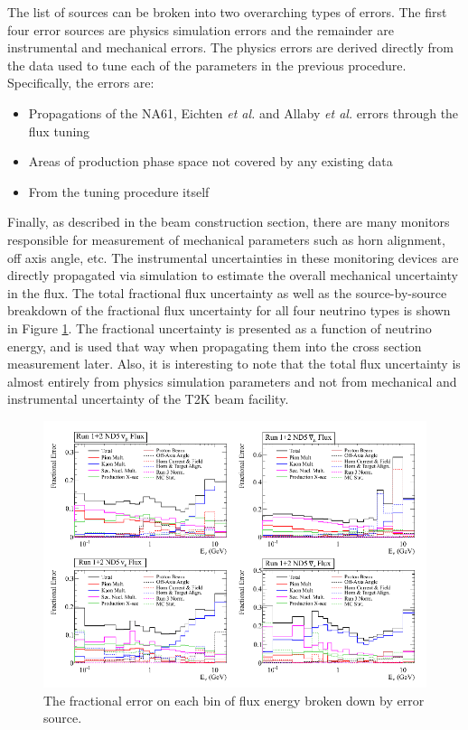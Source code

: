 The list of sources can be broken into two overarching types of errors. The first four error sources are physics simulation errors and the remainder are instrumental and mechanical errors. The physics errors are derived directly from the data used to tune each of the parameters in the previous procedure. Specifically, the errors are:

\begin{itemize}
\item Propagations of the NA61, Eichten {\it et al.} and Allaby {\it et al.} errors through the flux tuning
\item Areas of production phase space not covered by any existing data
\item From the tuning procedure itself
\end{itemize}

Finally, as described in the beam construction section, there are many monitors responsible for measurement of mechanical parameters such as horn alignment, off axis angle, etc. The instrumental uncertainties in these monitoring devices are directly propagated via simulation to estimate the overall mechanical uncertainty in the flux. The total fractional flux uncertainty as well as the source-by-source breakdown of the fractional flux uncertainty for all four neutrino types is shown in Figure \ref{fig:fracuncertainty}. The fractional uncertainty is presented as a function of neutrino energy, and is used that way when propagating them into the cross section measurement later. Also, it is interesting to note that the total flux uncertainty is almost entirely from physics simulation parameters and not from mechanical and instrumental uncertainty of the T2K beam facility.

\begin{figure}
\centering
\includegraphics[width=6.5in]{Figures/flux/fracuncertainty.PNG}
\caption{The fractional error on each bin of flux energy broken down by error source.} 
\label{fig:fracuncertainty}
\end{figure}

